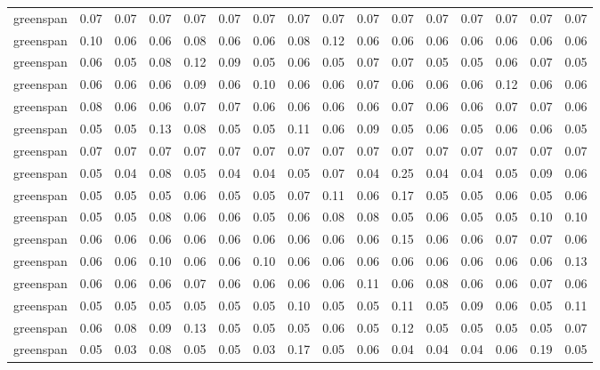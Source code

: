 \begin{tabular}{lrrrrrrrrrrrrrrr}
 greenspan & 0.07 & 0.07 & 0.07 & 0.07 & 0.07 & 0.07 & 0.07 & 0.07 & 0.07 &  0.07 &  0.07 &  0.07 &  0.07 &  0.07 &  0.07 \\
 greenspan & 0.10 & 0.06 & 0.06 & 0.08 & 0.06 & 0.06 & 0.08 & 0.12 & 0.06 &  0.06 &  0.06 &  0.06 &  0.06 &  0.06 &  0.06 \\
 greenspan & 0.06 & 0.05 & 0.08 & 0.12 & 0.09 & 0.05 & 0.06 & 0.05 & 0.07 &  0.07 &  0.05 &  0.05 &  0.06 &  0.07 &  0.05 \\
 greenspan & 0.06 & 0.06 & 0.06 & 0.09 & 0.06 & 0.10 & 0.06 & 0.06 & 0.07 &  0.06 &  0.06 &  0.06 &  0.12 &  0.06 &  0.06 \\
 greenspan & 0.08 & 0.06 & 0.06 & 0.07 & 0.07 & 0.06 & 0.06 & 0.06 & 0.06 &  0.07 &  0.06 &  0.06 &  0.07 &  0.07 &  0.06 \\
 greenspan & 0.05 & 0.05 & 0.13 & 0.08 & 0.05 & 0.05 & 0.11 & 0.06 & 0.09 &  0.05 &  0.06 &  0.05 &  0.06 &  0.06 &  0.05 \\
 greenspan & 0.07 & 0.07 & 0.07 & 0.07 & 0.07 & 0.07 & 0.07 & 0.07 & 0.07 &  0.07 &  0.07 &  0.07 &  0.07 &  0.07 &  0.07 \\
 greenspan & 0.05 & 0.04 & 0.08 & 0.05 & 0.04 & 0.04 & 0.05 & 0.07 & 0.04 &  0.25 &  0.04 &  0.04 &  0.05 &  0.09 &  0.06 \\
 greenspan & 0.05 & 0.05 & 0.05 & 0.06 & 0.05 & 0.05 & 0.07 & 0.11 & 0.06 &  0.17 &  0.05 &  0.05 &  0.06 &  0.05 &  0.06 \\
 greenspan & 0.05 & 0.05 & 0.08 & 0.06 & 0.06 & 0.05 & 0.06 & 0.08 & 0.08 &  0.05 &  0.06 &  0.05 &  0.05 &  0.10 &  0.10 \\
 greenspan & 0.06 & 0.06 & 0.06 & 0.06 & 0.06 & 0.06 & 0.06 & 0.06 & 0.06 &  0.15 &  0.06 &  0.06 &  0.07 &  0.07 &  0.06 \\
 greenspan & 0.06 & 0.06 & 0.10 & 0.06 & 0.06 & 0.10 & 0.06 & 0.06 & 0.06 &  0.06 &  0.06 &  0.06 &  0.06 &  0.06 &  0.13 \\
 greenspan & 0.06 & 0.06 & 0.06 & 0.07 & 0.06 & 0.06 & 0.06 & 0.06 & 0.11 &  0.06 &  0.08 &  0.06 &  0.06 &  0.07 &  0.06 \\
 greenspan & 0.05 & 0.05 & 0.05 & 0.05 & 0.05 & 0.05 & 0.10 & 0.05 & 0.05 &  0.11 &  0.05 &  0.09 &  0.06 &  0.05 &  0.11 \\
 greenspan & 0.06 & 0.08 & 0.09 & 0.13 & 0.05 & 0.05 & 0.05 & 0.06 & 0.05 &  0.12 &  0.05 &  0.05 &  0.05 &  0.05 &  0.07 \\
 greenspan & 0.05 & 0.03 & 0.08 & 0.05 & 0.05 & 0.03 & 0.17 & 0.05 & 0.06 &  0.04 &  0.04 &  0.04 &  0.06 &  0.19 &  0.05 \\

\end{tabular}
